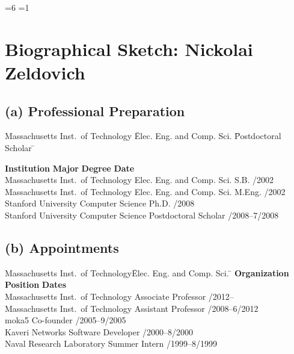 \documentclass{article}
\begin{document}
=6 %
=1 %
\section*{Biographical Sketch: Nickolai Zeldovich}

\subsection*{(a) Professional Preparation}

\begin{tabbing}
Massachusetts Inst.\ of Technology \quad \=
    Elec. Eng. and Comp. Sci. \quad \=
    Postdoctoral Scholar \quad \=
    \kill

\textbf{Institution} \> \textbf{Major} \> \textbf{Degree} \> \textbf{Date} \\
Massachusetts Inst.\ of Technology \> Elec. Eng. and Comp. Sci. \> S.B. /2002 \\
Massachusetts Inst.\ of Technology \> Elec. Eng. and Comp. Sci. \> M.Eng. /2002 \\
Stanford University \> Computer Science \> Ph.D. /2008 \\
Stanford University \> Computer Science \> Postdoctoral Scholar /2008--7/2008 \\
\end{tabbing}

\subsection*{(b) Appointments}

\begin{tabbing}
Massachusetts Inst.\ of Technology\quad \=
    Elec. Eng. and Comp. Sci. \quad \=
    \kill
\textbf{Organization}\> \textbf{Position}\> \textbf{Dates}\\

Massachusetts Inst.\ of Technology \> Associate Professor /2012-- \\
Massachusetts Inst.\ of Technology \> Assistant Professor /2008--6/2012 \\
moka5 \> Co-founder /2005--9/2005 \\
Kaveri Networks \> Software Developer /2000--8/2000 \\
Naval Research Laboratory \> Summer Intern /1999--8/1999 \\

\end{tabbing}
\end{document}
